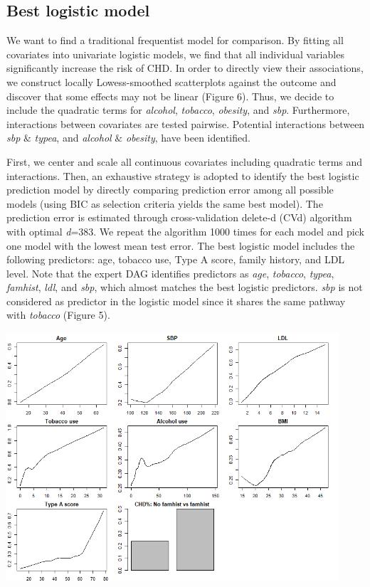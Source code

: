 \documentclass{article}
\begin{document}
\subsection{Best logistic model}
We want to find a traditional frequentist model for comparison. By fitting all covariates into univariate logistic models, we find that all individual variables significantly increase the risk of CHD. In order to directly view their associations, we construct locally Lowess-smoothed scatterplots against the outcome and discover that some effects may not be linear (Figure 6). Thus, we decide to include the quadratic terms for \textit{alcohol}, \textit{tobacco}, \textit{obesity}, and \textit{sbp}. Furthermore, interactions between covariates are tested pairwise. Potential interactions between \textit{sbp} $\&$ \textit{typea}, and \textit{alcohol} $\&$ \textit{obesity}, have been identified. \par

First, we center and scale all continuous covariates including quadratic terms and interactions. Then, an exhaustive strategy is adopted to identify the best logistic prediction model by directly comparing prediction error among all possible models (using BIC as selection criteria yields the same best model). The prediction error is estimated through cross-validation delete-d (CVd) algorithm with optimal \textit{d}=383. We repeat the algorithm 1000 times for each model and pick one model with the lowest mean test error. The best logistic model includes the following predictors: age, tobacco use, Type A score, family history, and LDL level. Note that the expert DAG identifies predictors as \textit{age}, \textit{tobacco}, \textit{typea}, \textit{famhist}, \textit{ldl}, and \textit{sbp}, which almost matches the best logistic predictors. \textit{sbp} is not considered as predictor in the logistic model since it shares the same pathway with \textit{tobacco} (Figure 5).  \par

\begin{center}
\includegraphics[width=4.87in,height=3.65in]{./media/image8.png}
\end{center}
\vspace{-2.5em}
\end{document}
